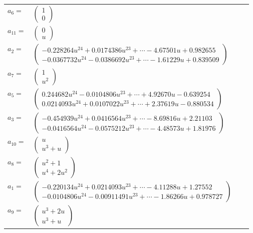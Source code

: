 \documentclass[1p]{elsarticle_modified}
\theoremstyle{definition}
\begin{document}
\begin{tabular}{m{7pt} m{180pt} m{7pt} m{180pt} }
\flushright $a_{6}=$&$\begin{pmatrix}1\\0\end{pmatrix}$ \\
\flushright $a_{11}=$&$\begin{pmatrix}0\\u\end{pmatrix}$ \\
\flushright $a_{2}=$&$\begin{pmatrix}-0.228264 u^{24}+0.0174386 u^{23}+\cdots-4.67501 u+0.982655\\-0.0367732 u^{24}-0.0386692 u^{23}+\cdots-1.61229 u+0.839509\end{pmatrix}$ \\
\flushright $a_{7}=$&$\begin{pmatrix}1\\u^2\end{pmatrix}$ \\
\flushright $a_{5}=$&$\begin{pmatrix}0.244682 u^{24}-0.0104806 u^{23}+\cdots+4.92670 u-0.639254\\0.0214093 u^{24}+0.0107022 u^{23}+\cdots+2.37619 u-0.880534\end{pmatrix}$ \\
\flushright $a_{3}=$&$\begin{pmatrix}-0.454939 u^{24}+0.0416564 u^{23}+\cdots-8.69816 u+2.21103\\-0.0416564 u^{24}-0.0575212 u^{23}+\cdots-4.48573 u+1.81976\end{pmatrix}$ \\
\flushright $a_{10}=$&$\begin{pmatrix}u\\u^3+u\end{pmatrix}$ \\
\flushright $a_{8}=$&$\begin{pmatrix}u^2+1\\u^4+2 u^2\end{pmatrix}$ \\
\flushright $a_{1}=$&$\begin{pmatrix}-0.220134 u^{24}+0.0214093 u^{23}+\cdots-4.11288 u+1.27552\\-0.0104806 u^{24}-0.00911491 u^{23}+\cdots-1.86266 u+0.978727\end{pmatrix}$ \\
\flushright $a_{9}=$&$\begin{pmatrix}u^3+2 u\\u^3+u\end{pmatrix}$ \\

\end{tabular}
\end{document}
